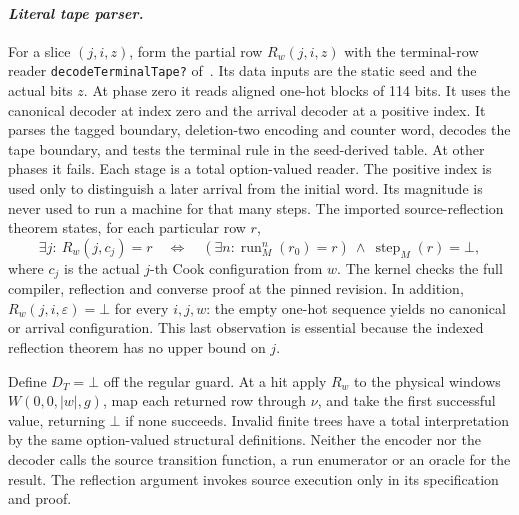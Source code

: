 \paragraph{\textit{Literal tape parser.}}
For a slice \((j,i,z)\), form the partial row \(R_w(j,i,z)\) with the terminal-row reader \texttt{decodeTerminalTape?} of~\cite{filin}. Its data inputs are the static seed and the actual bits \(z\). At phase zero it reads aligned one-hot blocks of 114 bits. It uses the canonical decoder at index zero and the arrival decoder at a positive index. It parses the tagged boundary, deletion-two encoding and counter word, decodes the tape boundary, and tests the terminal rule in the seed-derived table. At other phases it fails. Each stage is a total option-valued reader. The positive index is used only to distinguish a later arrival from the initial word. Its magnitude is never used to run a machine for that many steps. The imported source-reflection theorem states, for each particular row \(r\),
\[
 \exists j:\ R_w(j,c_j)=r
 \quad\Longleftrightarrow\quad
 (\exists n:\operatorname{run}_{M}^{n}(r_0)=r)\ \land\ \operatorname{step}_M(r)=\bot ,
\]
where \(c_j\) is the actual \(j\)-th Cook configuration from \(w\). The kernel checks the full compiler, reflection and converse proof at the pinned revision. In addition, \(R_w(j,i,\varepsilon)=\bot\) for every \(i,j,w\): the empty one-hot sequence yields no canonical or arrival configuration. This last observation is essential because the indexed reflection theorem has no upper bound on \(j\).

Define \(D_T=\bot\) off the regular guard. At a hit apply \(R_w\) to the physical windows \(W(0,0,|w|,g)\), map each returned row through \(\nu\), and take the first successful value, returning \(\bot\) if none succeeds. Invalid finite trees have a total interpretation by the same option-valued structural definitions. Neither the encoder nor the decoder calls the source transition function, a run enumerator or an oracle for the result. The reflection argument invokes source execution only in its specification and proof.

